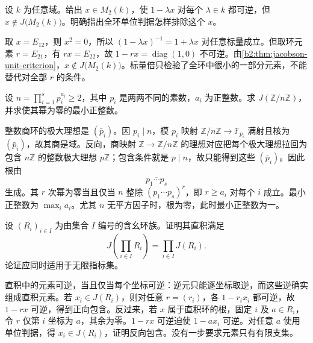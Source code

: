 \BookExercises

\begin{exercise}\label{b2:ex:14-scalar-unit-test}
	设 \(k\) 为任意域。给出 \(x\in M_2(k)\)，使 \(1-\lambda x\) 对每个 \(\lambda\in k\) 都可逆，但 \(x\notin J\bigl(M_2(k)\bigr)\)。明确指出全环单位判据怎样排除这个 \(x\)。
\end{exercise}
\begin{solution}
	取 \(x=E_{12}\)，则 \(x^2=0\)，所以 \((1-\lambda x)^{-1}=1+\lambda x\) 对任意标量成立。但取环元素 \(r=E_{21}\)，有 \(rx=E_{22}\)，故 \(1-rx=\operatorname{diag}(1,0)\) 不可逆。由\cref{b2:thm:jacobson-unit-criterion}，\(x\notin J\bigl(M_2(k)\bigr)\)。标量倍只检验了全环中很小的一部分元素，不能替代对全部 \(r\) 的条件。
\end{solution}

\begin{exercise}\label{b2:ex:14-integer-quotient-radical}
	设 \(n=\prod_{i=1}^s p_i^{a_i}\ge2\)，其中 \(p_i\) 是两两不同的素数，\(a_i\) 为正整数。求 \(J(\mathbb Z/n\mathbb Z)\)，并求使其幂为零的最小正整数。
\end{exercise}
\begin{solution}
	整数商环的极大理想是 \((\bar p_i)\)。因 \(p_i\mid n\)，模 \(p_i\) 映射 \(\mathbb Z/n\mathbb Z\to\mathbb F_{p_i}\) 满射且核为 \((\bar p_i)\)，故其商是域。反向，商映射 \(\mathbb Z\to\mathbb Z/n\mathbb Z\) 的理想对应把每个极大理想拉回为包含 \(n\mathbb Z\) 的整数极大理想 \(p\mathbb Z\)；包含条件就是 \(p\mid n\)，故只能得到这些 \((\bar p_i)\)。因此根由
	\[
		\overline{p_1\cdots p_s}
	\]
	生成。其 \(r\) 次幂为零当且仅当 \(n\) 整除 \((p_1\cdots p_s)^r\)，即 \(r\ge a_i\) 对每个 \(i\) 成立。最小正整数为 \(\max_i a_i\)。尤其 \(n\) 无平方因子时，根为零，此时最小正整数为一。
\end{solution}

\begin{exercise}\label{b2:ex:14-product-radical}
	设 \((R_i)_{i\in I}\) 为由集合 \(I\) 编号的含幺环族。证明其直积满足
	\[
		J\left(\prod_{i\in I}R_i\right)=\prod_{i\in I}J(R_i).
	\]
	论证应同时适用于无限指标集。
\end{exercise}
\begin{solution}
	直积中的元素可逆，当且仅当每个坐标可逆：逆元只能逐坐标取逆，而这些逆确实组成直积元素。若 \(x_i\in J(R_i)\)，则对任意 \(r=(r_i)\)，各 \(1-r_ix_i\) 都可逆，故 \(1-rx\) 可逆，得到正向包含。反过来，若 \(x\) 属于直积环的根，固定 \(i\) 及 \(a\in R_i\)，令 \(r\) 仅第 \(i\) 坐标为 \(a\)，其余为零。\(1-rx\) 可逆迫使 \(1-ax_i\) 可逆。对任意 \(a\) 使用单位判据，得 \(x_i\in J(R_i)\)，证明反向包含。没有一步要求元素只有有限支集。
\end{solution}

